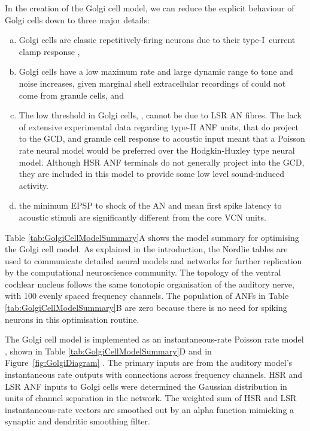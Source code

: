 In the creation of the Golgi cell model, we can reduce the explicit behaviour of
Golgi cells down to three major details:
\begin{enumerate}[a)]
\item Golgi cells are classic repetitively-firing neurons due to their
  type-I~current clamp response \citep{FerragamoGoldingEtAl:1998},
\item Golgi cells have a low maximum rate and large dynamic range to tone and
  noise increases, given marginal shell extracellular recordings of
  \citet{GhoshalKim:1997} could not come from granule cells, and
\item The low threshold in Golgi cells, \citet{GhoshalKim:1997}, cannot be due
  to LSR AN fibres. The lack of extensive experimental data regarding type-II
  ANF units, that do project to the GCD, and granule cell response to acoustic
  input meant that a Poisson rate neural model would be preferred over the
  Hodgkin-Huxley type neural model.  Although HSR ANF terminals do not generally
  project into the GCD, they are included in this model to provide some low
  level sound-induced activity.
\item the minimum EPSP to shock of the AN \citep{FerragamoGoldingEtAl:1998} and
  mean first spike latency to acoustic stimuli \citep{GhoshalKim:1997} are
  significantly different from the core VCN units.
\end{enumerate}

Table \ref{tab:GolgiCellModelSummary}A shows the model summary for optimising
the Golgi cell model. As explained in the introduction, the Nordlie tables are
used to communicate detailed neural models and networks for further replication
by the computational neuroscience community. The topology of the ventral
cochlear nucleus follows the same tonotopic organisation of the auditory nerve,
with 100 evenly spaced frequency channels. The population of ANFs in Table
\ref{tab:GolgiCellModelSummary}B are zero because there is no need for spiking
neurons in this optimisation routine.  

 

The Golgi cell model is implemented as an instantaneous-rate Poisson rate model
, shown in Table \ref{tab:GolgiCellModelSummary}D and in
Figure~\ref{fig:GolgiDiagram} . The primary inputs are from the auditory model's
instantaneous rate outputs with connections across frequency channels. HSR and
LSR ANF inputs to Golgi cells were determined the Gaussian distribution in units
of channel separation in the network. The weighted sum of HSR and LSR
instantaneous-rate vectors are smoothed out by an alpha function mimicking a
synaptic and dendritic smoothing filter.

